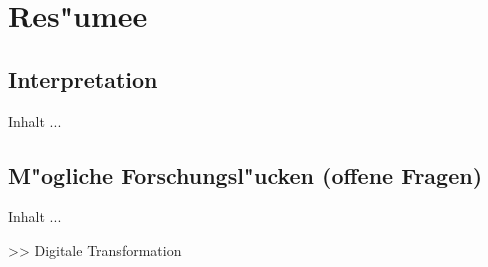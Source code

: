 
\chapter{Res"umee}
\minitoc 
\vspace{1 cm} 

\section{Interpretation}
Inhalt ...


\section{M"ogliche Forschungsl"ucken (offene Fragen)}
Inhalt ...

>> Digitale Transformation



